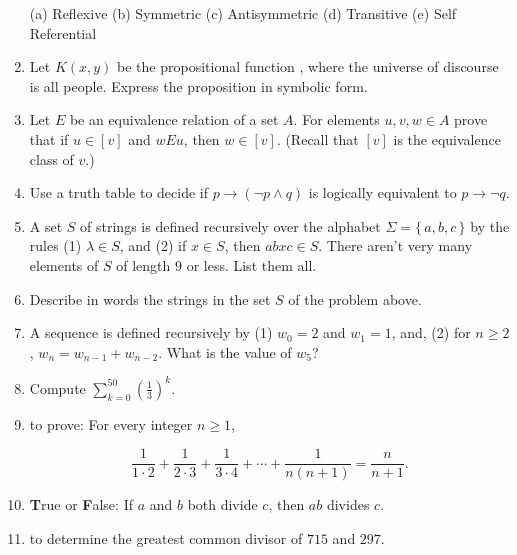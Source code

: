 \begin{enumerate}
\vskip 5pt
\hskip 20pt (a) Reflexive\hfill
\vskip 5pt
\hskip 20pt (b) Symmetric\hfill
\vskip 5pt
\hskip 20pt (c) Antisymmetric\hfill
\vskip 5pt
\hskip 20pt (d) Transitive\hfill
\vskip 5pt
\hskip 20pt (e) Self Referential\hfill
\medskip 
\item Let $K(x,y)$ be the propositional function , where the universe of discourse is all people. Express the proposition  in symbolic  form.
\medskip 
\item Let $E$ be an equivalence relation of a set $A$. For elements $u,v,w\in A$ prove that if $u\in [v]$ and
$wEu$, then $w\in [v]$. (Recall that $[v]$ is the equivalence class of $v$.)
\medskip 
\item   Use a truth table to decide if $p\rightarrow(\lnot p\land q)$ is logically equivalent
to $p\rightarrow \lnot q$.




\item  A set $S$ of strings is defined recursively over the alphabet $\Sigma = \{\,a,b,c\,\}$
by the rules (1) $\lambda\in S$, and (2) if $x\in S$, then $abxc\in S$. There aren't very
many elements of $S$ of length $9$ or less. List them all.

\medskip

\item Describe in words the strings in the set $S$ of the problem above.

\medskip

\item A sequence is defined recursively by (1) $w_0 = 2$ and $w_1 = 1$, and,
(2) for $n\geq 2$,  $w_n = w_{n-1} + w_{n-2}$. What is the value of $w_5$?

\medskip

\item Compute $\displaystyle \sum_{k=0}^{50} \left(\frac{1}{3}\right)^k$.

\medskip

\item {} to prove: For every integer $n\geq 1$,

\[
\frac{1}{1\cdot2}+\frac{1}{2\cdot3}+\frac{1}{3\cdot4}+\cdots+\frac{1}{n(n+1)}= \frac{n}{n+1}.
\]


\item {\bf T}rue or {\bf F}alse:  If $a$ and $b$ both divide $c$, then $ab$ divides $c$.

\medskip
\item {} to determine 
the greatest 
common divisor of $715$ and $297$. 


\end{enumerate}
